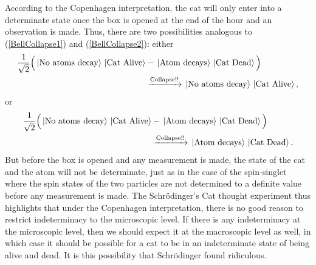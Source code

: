     According to the Copenhagen interpretation, the cat will only enter into a determinate state once the box is opened at the end of the hour and an observation is made. Thus, there are two possibilities analogous to (\ref{BellCollapse1}) and (\ref{BellCollapse2}): either
\begin{equation*}
    \begin{split}
\frac{1}{\sqrt{2}}\Big(\ket*{\text{No atoms decay}}\ket*{\text{Cat Alive}}&-\ket*{\text{Atom decays}}\ket*{\text{Cat Dead}}\Big)\\
&\xrightarrow{\text{Collapse!!}}\ket*{\text{No atoms decay}}\ket*{\text{Cat Alive}},
\end{split}
\end{equation*}
or
\begin{equation*}
\begin{split}
\frac{1}{\sqrt{2}}\Big(\ket*{\text{No atoms decay}}\ket*{\text{Cat Alive}}&-\ket*{\text{Atom decays}}\ket*{\text{Cat Dead}}\Big)\\
&\xrightarrow{\text{Collapse!!}}\ket*{\text{Atom decays}}\ket*{\text{Cat Dead}}.
\end{split}
\end{equation*}
But before the box is opened and any measurement is made, the state of the cat and the atom will not be determinate, just as in the case of the spin-singlet where the spin states of the two particles are not determined to a definite value before any measurement is made. The Schr\"{o}dinger's Cat thought experiment thus highlights that under the Copenhagen interpretation, there is no good reason to restrict  indeterminacy to the microscopic level. If there is any indeterminacy at the microscopic level, then we should expect it at the macroscopic level as well, in which case it should be possible for a cat to be in an indeterminate state of being alive and dead. It is this possibility that Schr\"{o}dinger found ridiculous. 





